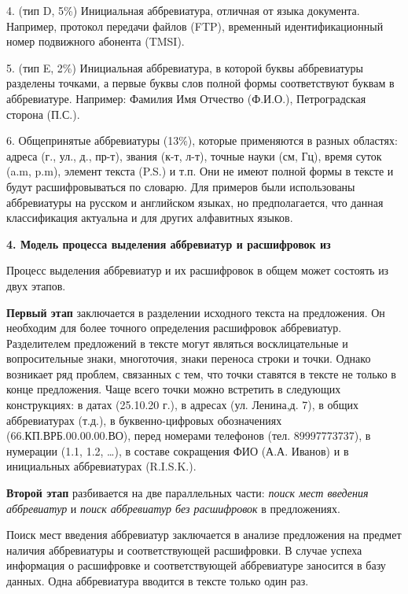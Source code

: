 \documentclass[14pt]{extarticle}
\begin{document}
4. (тип D, 5\%) Инициальная аббревиатура, отличная от языка документа. Например, протокол передачи файлов (FTP), временный идентификационный номер подвижного абонента (TMSI).

5. (тип E, 2\%) Инициальная аббревиатура, в которой буквы аббревиатуры разделены точками, а первые буквы слов полной формы соответствуют буквам в аббревиатуре. Например: Фамилия Имя Отчество (Ф.И.О.), Петроградская сторона (П.С.).

\newpage

6. Общепринятые аббревиатуры (13\%), которые применяются в разных областях: адреса (г., ул., д., пр-т), звания (к-т, л-т), точные науки (см, Гц), время суток (a.m, p.m), элемент текста (P.S.) и т.п. Они не имеют полной формы в тексте и будут расшифровываться по словарю.
Для примеров были использованы аббревиатуры на русском и английском языках, но предполагается, что данная классификация актуальна и для других алфавитных языков.

\hspace{1cm}

\textbf{4. Модель процесса выделения аббревиатур и расшифровок из }

Процесс выделения аббревиатур и их расшифровок в общем может состоять из двух этапов.

\textbf{Первый этап} заключается в разделении исходного текста на предложения. Он необходим для более точного определения расшифровок аббревиатур. Разделителем предложений в тексте могут являться восклицательные и вопросительные знаки, многоточия, знаки переноса строки и точки. Однако возникает ряд проблем, связанных с тем, что точки ставятся в тексте не только в конце предложения. Чаще всего точки можно встретить в следующих конструкциях: в датах (25.10.20 г.), в адресах (ул. Ленина,д. 7), в общих аббревиатурах (т.д.), в буквенно-цифровых обозначениях (66.КП.ВРБ.00.00.00.ВО), перед номерами телефонов (тел. 89997773737), в нумерации (1.1, 1.2, …), в составе сокращения ФИО (А.А. Иванов) и в инициальных аббревиатурах (R.I.S.K.).

\textbf{Второй этап} разбивается на две параллельных части: \textit{поиск мест введения аббревиатур} и \textit{поиск аббревиатур без расшифровок} в предложениях.

Поиск мест введения аббревиатур заключается в анализе предложения на предмет наличия аббревиатуры и соответствующей расшифровки. В случае успеха информация о расшифровке и соответствующей аббревиатуре заносится в базу данных. Одна аббревиатура вводится в тексте только один раз.
\end{document}
